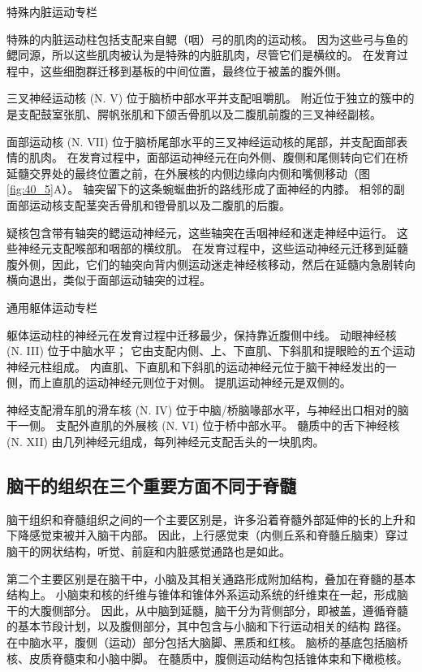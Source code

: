 特殊内脏运动专栏

特殊的内脏运动柱包括支配来自鳃（咽）弓的肌肉的运动核。 因为这些弓与鱼的鳃同源，所以这些肌肉被认为是特殊的内脏肌肉，尽管它们是横纹的。 在发育过程中，这些细胞群迁移到基板的中间位置，最终位于被盖的腹外侧。

三叉神经运动核 (N. V) 位于脑桥中部水平并支配咀嚼肌。 附近位于独立的簇中的是支配鼓室张肌、腭帆张肌和下颌舌骨肌以及二腹肌前腹的三叉神经副核。

面部运动核 (N. VII) 位于脑桥尾部水平的三叉神经运动核的尾部，并支配面部表情的肌肉。 在发育过程中，面部运动神经元在向外侧、腹侧和尾侧转向它们在桥延髓交界处的最终位置之前，在外展核的内侧边缘向内侧和嘴侧移动（图 \ref{fig:40_5}A）。 轴突留下的这条蜿蜒曲折的路线形成了面神经的内膝。 相邻的副面部运动核支配茎突舌骨肌和镫骨肌以及二腹肌的后腹。

疑核包含带有轴突的鳃运动神经元，这些轴突在舌咽神经和迷走神经中运行。 这些神经元支配喉部和咽部的横纹肌。 在发育过程中，这些运动神经元迁移到延髓腹外侧，因此，它们的轴突向背内侧运动迷走神经核移动，然后在延髓内急剧转向横向退出，类似于面部运动轴突的过程。

通用躯体运动专栏

躯体运动柱的神经元在发育过程中迁移最少，保持靠近腹侧中线。 动眼神经核 (N. III) 位于中脑水平； 它由支配内侧、上、下直肌、下斜肌和提眼睑的五个运动神经元柱组成。 内直肌、下直肌和下斜肌的运动神经元位于脑干神经发出的一侧，而上直肌的运动神经元则位于对侧。 提肌运动神经元是双侧的。

神经支配滑车肌的滑车核 (N. IV) 位于中脑/桥脑喙部水平，与神经出口相对的脑干一侧。 支配外直肌的外展核 (N. VI) 位于桥中部水平。 髓质中的舌下神经核 (N. XII) 由几列神经元组成，每列神经元支配舌头的一块肌肉。



\subsection{脑干的组织在三个重要方面不同于脊髓}

脑干组织和脊髓组织之间的一个主要区别是，许多沿着脊髓外部延伸的长的上升和下降感觉束被并入脑干内部。 因此，上行感觉束（内侧丘系和脊髓丘脑束）穿过脑干的网状结构，听觉、前庭和内脏感觉通路也是如此。

第二个主要区别是在脑干中，小脑及其相关通路形成附加结构，叠加在脊髓的基本结构上。 小脑束和核的纤维与锥体和锥体外系运动系统的纤维束在一起，形成脑干的大腹侧部分。 因此，从中脑到延髓，脑干分为背侧部分，即被盖，遵循脊髓的基本节段计划，以及腹侧部分，其中包含与小脑和下行运动相关的结构 路径。 在中脑水平，腹侧（运动）部分包括大脑脚、黑质和红核。 脑桥的基底包括脑桥核、皮质脊髓束和小脑中脚。 在髓质中，腹侧运动结构包括锥体束和下橄榄核。

